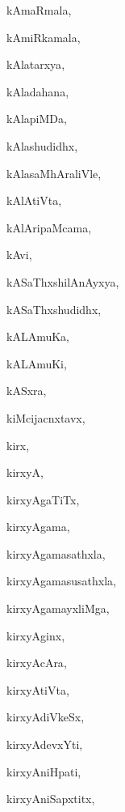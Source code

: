 \begin{multicols}{3}
{\noindent
{kAmaRmala}, \pageref{kAmaRmala}

\noindent
{kAmiRkamala}, \pageref{kAmiRkamala}

\noindent
{kAlatarxya}, \pageref{kAlatarxya}

\noindent
{kAladahana}, \pageref{kAladahana}

\noindent
{kAlapiMDa}, \pageref{kAlapiMDa}

\noindent
{kAlashudidhx}, \pageref{kAlashudidhx}

\noindent
{kAlasaMhAraliVle}, \pageref{kAlasaMhAraliVle}

\noindent
{kAlAtiVta}, \pageref{kAlAtiVta}

\noindent
{kAlAripaMcama}, \pageref{kAlAripaMcama}

\noindent
{kAvi}, \pageref{kAvi}

\noindent
{kASaThxshilAnAyxya}, \pageref{kASaThxshilAnAyxya}

\noindent
{kASaThxshudidhx}, \pageref{kASaThxshudidhx}

\noindent
{kALAmuKa}, \pageref{kALAmuKa}

\noindent
{kALAmuKi}, \pageref{kALAmuKi}

\noindent
{kASxra}, \pageref{kASxra}

\noindent
{kiMcijacnxtavx}, \pageref{kiMcijacnxtavx}

\noindent
{kirx}, \pageref{kirx}

\noindent
{kirxyA}, \pageref{kirxyA}

\noindent
{kirxyAgaTiTx}, \pageref{kirxyAgaTiTx}

\noindent
{kirxyAgama}, \pageref{kirxyAgama}

\noindent
{kirxyAgamasathxla}, \pageref{kirxyAgamasathxla}

\noindent
{kirxyAgamasusathxla}, \pageref{kirxyAgamasusathxla}

\noindent
{kirxyAgamayxliMga}, \pageref{kirxyAgamayxliMga}

\noindent
{kirxyAginx}, \pageref{kirxyAginx}

\noindent
{kirxyAcAra}, \pageref{kirxyAcAra}

\noindent
{kirxyAtiVta}, \pageref{kirxyAtiVta}

\noindent
{kirxyAdiVkeSx}, \pageref{kirxyAdiVkeSx}

\noindent
{kirxyAdevxYti}, \pageref{kirxyAdevxYti}

\noindent
{kirxyAniHpati}, \pageref{kirxyAniHpati}

\noindent
{kirxyAniSapxtitx}, \pageref{kirxyAniSapxtitx}

}
\end{multicols}
